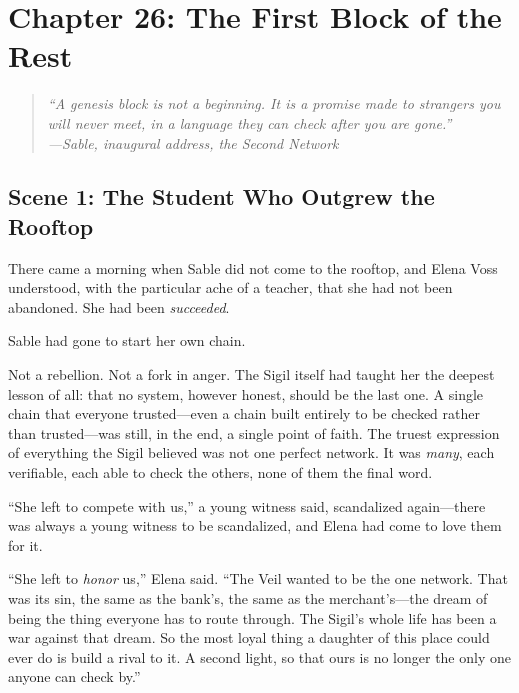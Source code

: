 \hypertarget{chapter-26-the-first-block-of-the-rest}{%
\section{Chapter 26: The First Block of the
Rest}\label{chapter-26-the-first-block-of-the-rest}}

\begin{quote}
\itshape ``A genesis block is not a beginning. It is a promise made to strangers
you will never meet, in a language they can check after you are gone.''\\
\normalfont\hfill---Sable, inaugural address, the Second Network
\end{quote}

\hypertarget{scene-1-the-student-who-outgrew-the-rooftop}{%
\subsection{Scene 1: The Student Who Outgrew the
Rooftop}\label{scene-1-the-student-who-outgrew-the-rooftop}}

There came a morning when Sable did not come to the rooftop, and Elena Voss
understood, with the particular ache of a teacher, that she had not been abandoned.
She had been \emph{succeeded}.

Sable had gone to start her own chain.

Not a rebellion. Not a fork in anger. The Sigil itself had taught her the deepest
lesson of all: that no system, however honest, should be the last one. A single chain
that everyone trusted---even a chain built entirely to be checked rather than
trusted---was still, in the end, a single point of faith. The truest expression of
everything the Sigil believed was not one perfect network. It was \emph{many}, each
verifiable, each able to check the others, none of them the final word.

``She left to compete with us,'' a young witness said, scandalized again---there was
always a young witness to be scandalized, and Elena had come to love them for it.

``She left to \emph{honor} us,'' Elena said. ``The Veil wanted to be the one network.
That was its sin, the same as the bank's, the same as the merchant's---the dream of
being the thing everyone has to route through. The Sigil's whole life has been a war
against that dream. So the most loyal thing a daughter of this place could ever do is
build a rival to it. A second light, so that ours is no longer the only one anyone can
check by.''

